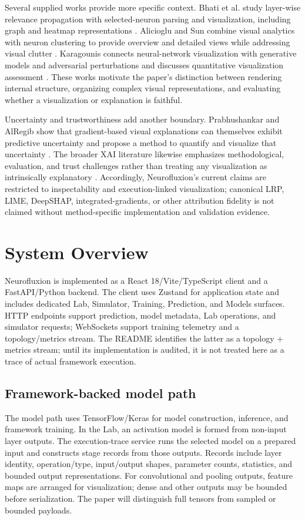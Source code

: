 \documentclass[conference]{IEEEtran}
\begin{document}
Several supplied works provide more specific context. Bhati et al. study layer-wise relevance propagation with selected-neuron parsing and visualization, including graph and heatmap representations \cite{bhati2024}. Alicioglu and Sun combine visual analytics with neuron clustering to provide overview and detailed views while addressing visual clutter \cite{alicioglu2024}. Karagounis connects neural-network visualization with generative models and adversarial perturbations and discusses quantitative visualization assessment \cite{karagounis2024}. These works motivate the paper's distinction between rendering internal structure, organizing complex visual representations, and evaluating whether a visualization or explanation is faithful.

Uncertainty and trustworthiness add another boundary. Prabhushankar and AlRegib show that gradient-based visual explanations can themselves exhibit predictive uncertainty and propose a method to quantify and visualize that uncertainty \cite{prabhushankar2024}. The broader XAI literature likewise emphasizes methodological, evaluation, and trust challenges rather than treating any visualization as intrinsically explanatory \cite{samek2021,ali2023,mohamed2025}. Accordingly, Neurofluxion's current claims are restricted to inspectability and execution-linked visualization; canonical LRP, LIME, DeepSHAP, integrated-gradients, or other attribution fidelity is not claimed without method-specific implementation and validation evidence.

\section{System Overview}
Neurofluxion is implemented as a React 18/Vite/TypeScript client and a FastAPI/Python backend. The client uses Zustand for application state and includes dedicated Lab, Simulator, Training, Prediction, and Models surfaces. HTTP endpoints support prediction, model metadata, Lab operations, and simulator requests; WebSockets support training telemetry and a topology/metrics stream. The README identifies the latter as a topology + metrics stream; until its implementation is audited, it is not treated here as a trace of actual framework execution.

\subsection{Framework-backed model path}
The model path uses TensorFlow/Keras for model construction, inference, and framework training. In the Lab, an activation model is formed from non-input layer outputs. The execution-trace service runs the selected model on a prepared input and constructs stage records from those outputs. Records include layer identity, operation/type, input/output shapes, parameter counts, statistics, and bounded output representations. For convolutional and pooling outputs, feature maps are arranged for visualization; dense and other outputs may be bounded before serialization. The paper will distinguish full tensors from sampled or bounded payloads.
\end{document}
